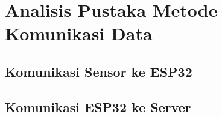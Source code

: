     \lipsum[1]

\section{Analisis Pustaka Metode Komunikasi Data}
\label{sec:Analisis_Komunikasi_Data}

    \subsection{Komunikasi Sensor ke ESP32}
    \label{sec:Komunikasi_Sensor_ESP32}

    \lipsum[1]

    \subsection{Komunikasi ESP32 ke Server}
    \label{sec:Komunikasi_ESP32_Server}

    \lipsum[1]

